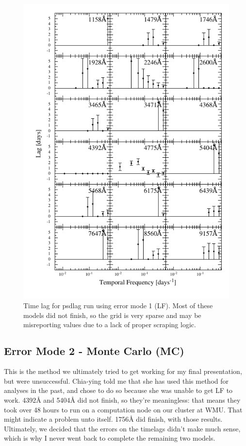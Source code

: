 \documentclass[11pt,letterpaper]{article}
\begin{document}
\begin{figure}
    \label{fig:lag_err1}
    \centering
    \includegraphics{../img/timelag_atlas_err1.pdf}
    \caption{Time lag for psdlag run using error mode 1 (LF). Most of these models did not finish, so the grid is very sparse and may be misreporting values due to a lack of proper scraping logic.}
\end{figure}



\subsection{Error Mode 2 - Monte Carlo (MC)}
This is the method we ultimately tried to get working for my final presentation, but were unsuccessful. Chia-ying told me that she has used this method for analyses in the past, and chose to do so because she was unable to get LF to work. 4392\AA$ $ and 5404\AA$ $ did not finish, so they're meaningless: that means they took over 48 hours to run on a computation node on our cluster at WMU. That might indicate a problem unto itself. 1756\AA$ $ did finish, with those results. Ultimately, we decided that the errors on the timelags didn't make much sense, which is why I never went back to complete the remaining two models.
\end{document}
